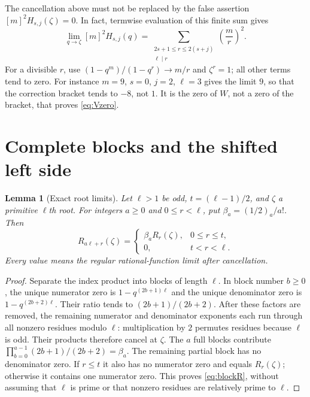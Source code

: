 \documentclass[11pt,a4paper]{article}
\newtheorem{lemma}[theorem]{Lemma}
\begin{document}
The cancellation above must not be replaced by the false assertion
$[m]^2H_{s,j}(\zeta)=0$. In fact, termwise evaluation of this finite sum gives
\begin{equation}
 \lim_{q\to\zeta}[m]^2H_{s,j}(q)
 =\sum_{\substack{2s+1\leq r\leq2(s+j)\\\ell\mid r}}
 \left(\frac{m}{r}\right)^2.\label{eq:Hlimit}
\end{equation}
For a divisible $r$, use $(1-q^m)/(1-q^r)\to m/r$ and $\zeta^r=1$;
all other terms tend to zero. For instance $m=9$, $s=0$, $j=2$, $\ell=3$
gives the limit $9$, so that the correction bracket tends to $-8$, not $1$.
It is the zero of $W$, not a zero of the bracket, that proves \eqref{eq:Vzero}.

\section{Complete blocks and the shifted left side}
\begin{lemma}[Exact root limits]
Let $\ell>1$ be odd, $t=(\ell-1)/2$, and $\zeta$ a primitive $\ell$th
root. For integers $a\geq0$ and $0\leq r<\ell$, put
$\beta_a=(1/2)_a/a!$. Then
\begin{equation}
 R_{a\ell+r}(\zeta)=
 \begin{cases}
 \beta_a R_r(\zeta),&0\leq r\leq t,\\
 0,&t<r<\ell.
 \end{cases}\label{eq:blockR}
\end{equation}
Every value means the regular rational-function limit after cancellation.
\end{lemma}
\begin{proof}
Separate the index product into blocks of length $\ell$. In block number
$b\geq0$, the unique numerator zero is $1-q^{(2b+1)\ell}$ and the unique
denominator zero is $1-q^{(2b+2)\ell}$. Their ratio tends to
$(2b+1)/(2b+2)$. After these factors are removed, the remaining numerator
and denominator exponents each run through all nonzero residues modulo
$\ell$: multiplication by $2$ permutes residues because $\ell$ is odd.
Their products therefore cancel at $\zeta$. The $a$ full blocks contribute
$\prod_{b=0}^{a-1}(2b+1)/(2b+2)=\beta_a$.
The remaining partial block has no denominator zero. If $r\leq t$ it also
has no numerator zero and equals $R_r(\zeta)$; otherwise it contains
one numerator zero. This proves \eqref{eq:blockR}, without assuming that
$\ell$ is prime or that nonzero residues are relatively prime to $\ell$.
\end{proof}
\end{document}
